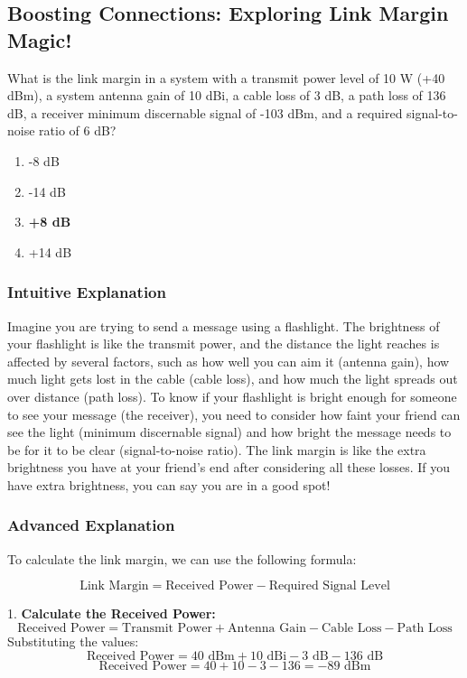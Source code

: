 \subsection{Boosting Connections: Exploring Link Margin Magic!}

\begin{tcolorbox}[colback=lightgray, colframe=black, title=E4D12]
What is the link margin in a system with a transmit power level of 10 W (+40 dBm), a system antenna gain of 10 dBi, a cable loss of 3 dB, a path loss of 136 dB, a receiver minimum discernable signal of -103 dBm, and a required signal-to-noise ratio of 6 dB? 
\begin{enumerate}[label=\Alph*.]
    \item -8 dB
    \item -14 dB
    \item \textbf{+8 dB}
    \item +14 dB
\end{enumerate}
\end{tcolorbox}

\subsubsection{Intuitive Explanation}
Imagine you are trying to send a message using a flashlight. The brightness of your flashlight is like the transmit power, and the distance the light reaches is affected by several factors, such as how well you can aim it (antenna gain), how much light gets lost in the cable (cable loss), and how much the light spreads out over distance (path loss). To know if your flashlight is bright enough for someone to see your message (the receiver), you need to consider how faint your friend can see the light (minimum discernable signal) and how bright the message needs to be for it to be clear (signal-to-noise ratio). The link margin is like the extra brightness you have at your friend's end after considering all these losses. If you have extra brightness, you can say you are in a good spot!

\subsubsection{Advanced Explanation}
To calculate the link margin, we can use the following formula:

\[
\text{Link Margin} = \text{Received Power} - \text{Required Signal Level}
\]

1. \textbf{Calculate the Received Power:}
   \[
   \text{Received Power} = \text{Transmit Power} + \text{Antenna Gain} - \text{Cable Loss} - \text{Path Loss}
   \]
   Substituting the values:
   \[
   \text{Received Power} = 40 \text{ dBm} + 10 \text{ dBi} - 3 \text{ dB} - 136 \text{ dB}
   \]
   \[
   \text{Received Power} = 40 + 10 - 3 - 136 = -89 \text{ dBm}
   \]

